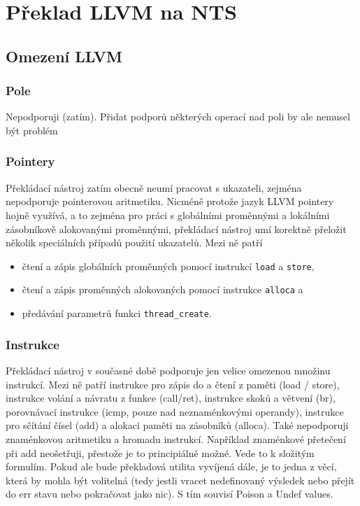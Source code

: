 \documentclass{fithesis2}
\begin{document}


\chapter{Překlad LLVM na NTS}
\section{Omezení LLVM}

\subsection{Pole}
Nepodporuji (zatím). Přidat podporů některých operací nad poli by ale nemusel být problém

\subsection{Pointery}
Překládací nástroj zatím obecně neumí pracovat s ukazateli, zejména nepodporuje pointerovou aritmetiku. Nicméně protože jazyk LLVM pointery hojně využívá, a to zejména pro práci s globálními proměnnými a lokálními zásobníkově alokovanými proměnnými, překládací nástroj umí korektně přeložit několik speciálních případů použití ukazatelů. Mezi ně patří
\begin{itemize}
\item čtení a zápis globálních proměnných pomocí instrukcí \texttt{load} a \texttt{store},
\item čtení a zápis proměnných alokovaných pomocí instrukce \texttt{alloca} a
\item předávání parametrů funkci \texttt{thread\_create}.
\end{itemize}

\subsection{Instrukce}
Překládací nástroj v současné době podporuje jen velice omezenou množinu instrukcí. Mezi ně patří instrukce pro zápis do a čtení z paměti (load / store), instrukce volání a návratu z funkce (call/ret), instrukce skoků a větvení (br), porovnávací instrukce (icmp, pouze nad neznaménkovými operandy), instrukce pro sčítání čísel (add) a alokaci paměti na zásobníků (alloca).
Také nepodporuji znaménkovou aritmetiku a hromadu instrukcí. Například znaménkové přetečení při add neošetřuji, přestože je to principiálně možné. Vede to k složitým formulím. Pokud ale bude překladová utilita vyvíjená dále, je to jedna z věcí, která by mohla být volitelná (tedy jestli vracet nedefinovaný výsledek nebo přejít do err stavu nebo pokračovat jako nic). S tím souvisí Poison a Undef values.
\end{document}
